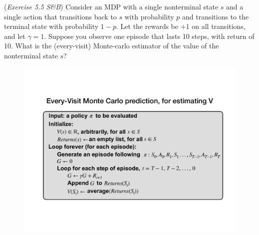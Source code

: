 (\textit{Exercise 5.5 S\&B}) Consider an MDP with a single nonterminal state $s$ and
a single action that transitions back to $s$ with 
probability $p$ and transitions to the terminal state with probability $1-p$.
Let the rewards be $+1$ on all transitions, and let $\gamma=1$. Suppose
you observe one episode that lasts 10 steps, with return of 10. What
is the (every-visit) Monte-carlo estimator of the value of the nonterminal state $s$?
\begin{figure}[h!]
  \center
\includegraphics[width=0.8\linewidth]{figures/c2_mc_everyvisit.pdf}
\end{figure}

